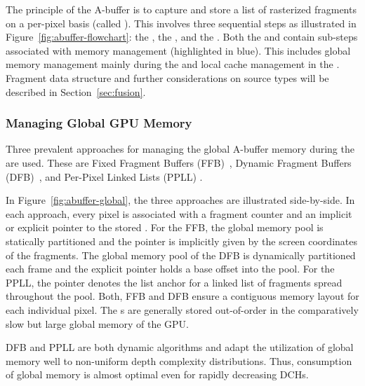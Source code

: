 \documentclass{egpubl}
\newcommand{\yellow}[1]{{\color{Goldenrod}#1}}
\newcommand{\minor}[1]{\yellow{#1}}
\newcommand{\todo}[1]{{\color{red}\emph{(#1)}}}
\newcommand{\ab}{\mbox{A-buffer}}
\newcommand{\dch}{DCH}
\begin{document}

The principle of the \ab{} is to capture and store a list of rasterized fragments on a per-pixel basis (called \emph{\bFraglist}). 
This involves three sequential steps as illustrated in Figure~\ref{fig:abuffer-flowchart}: the \sClear, the \sFill, and the \sResolve. 
Both the \sFill{} and \sResolve{} contain sub-steps associated with memory management (highlighted in blue). 
This includes global memory management mainly during the \sFill{} and local cache management in the \sResolve.
Fragment data structure and further considerations on source types will be described in Section~\ref{sec:fusion}.





\subsubsection*{Managing Global GPU Memory}

Three prevalent approaches for managing the global \ab{} memory during the \sFill{} are used.
These are Fixed Fragment Buffers (FFB)~\cite{Crassin2010}, Dynamic Fragment Buffers (DFB)~\minor{\cite{Maule2012,Vasilakis2012}}, and Per-Pixel Linked Lists (PPLL) \cite{kainz2009ray,Yang2010,Crassin2010}. 

In Figure~\ref{fig:abuffer-global}, the three approaches are illustrated side-by-side.  
In each approach, every pixel is associated with a fragment counter and an implicit or explicit pointer to the stored \bFraglist. 
For the FFB, the global memory pool is statically partitioned and the pointer is implicitly given by the screen coordinates of the fragments. 
The global memory pool of the DFB is dynamically partitioned each frame and the explicit pointer holds a base offset into the pool. 
For the PPLL, the pointer denotes the list anchor for a linked list of fragments spread throughout the pool. 
Both, FFB and DFB ensure a contiguous memory layout for each individual pixel. 
The \bFraglist s are generally stored out-of-order in the comparatively slow but large global memory of the GPU.

DFB and PPLL are both dynamic algorithms and adapt the utilization of global memory well to non-uniform depth complexity distributions. 
Thus, consumption of global memory is almost optimal even for rapidly decreasing \dch{}s. 
\end{document}
